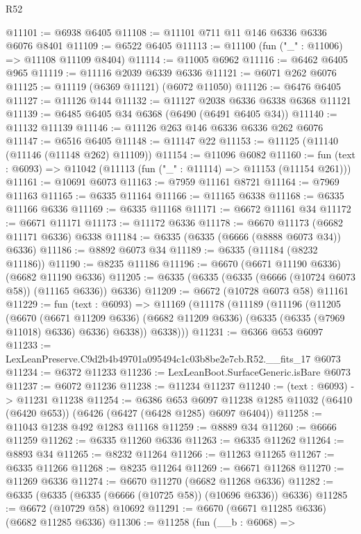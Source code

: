 \begin{lexlean}{R52}
\begin{coremodule}
@11101 := @6938 @6405
@11108 := @11101 @711 @11 @146 @6336 @6336 @6076 @8401
@11109 := @6522 @6405
@11113 := @11100 (fun ("_" : @11006) => @11108 @11109 @8404)
@11114 := @11005 @6962
@11116 := @6462 @6405 @965
@11119 := @11116 @2039 @6339 @6336
@11121 := @6071 @262 @6076
@11125 := @11119 (@6369 @11121) (@6072 @11050)
@11126 := @6476 @6405
@11127 := @11126 @144
@11132 := @11127 @2038 @6336 @6338 @6368 @11121
@11139 := @6485 @6405 @34 @6368 (@6490 (@6491 @6405 @34))
@11140 := @11132 @11139
@11146 := @11126 @263 @146 @6336 @6336 @262 @6076
@11147 := @6516 @6405
@11148 := @11147 @22
@11153 := @11125 (@11140 (@11146 (@11148 @262) @11109))
@11154 := @11096 @6082
@11160 := fun (text : @6093) => @11042 (@11113 (fun ("_" : @11114) => @11153 (@11154 @261)))
@11161 := @10691 @6073
@11163 := @7959 @11161 @8721
@11164 := @7969 @11163
@11165 := @6335 @11164
@11166 := @11165 @6338
@11168 := @6335 @11166 @6336
@11169 := @6335 @11168
@11171 := @6672 @11161 @34
@11172 := @6671 @11171
@11173 := @11172 @6336
@11178 := @6670 @11173 (@6682 @11171 @6336) @6338
@11184 := @6335 (@6335 (@6666 (@8888 @6073 @34)) @6336)
@11186 := @8892 @6073 @34
@11189 := @6335 (@11184 (@8232 @11186))
@11190 := @8235 @11186
@11196 := @6670 (@6671 @11190 @6336) (@6682 @11190 @6336)
@11205 := @6335 (@6335 (@6335 (@6666 (@10724 @6073 @58)) (@11165 @6336)) @6336)
@11209 := @6672 (@10728 @6073 @58) @11161
@11229 := fun (text : @6093) =>
  @11169
    (@11178
      (@11189
        (@11196
          (@11205
            (@6670
              (@6671 @11209 @6336)
              (@6682 @11209 @6336)
              (@6335 (@6335 (@7969 @11018) @6336) @6336)
              @6338))
          @6338)))
@11231 := @6366 @653 @6097
@11233 := LexLeanPreserve.C9d2b4b49701a095494c1c03b8be2e7cb.R52.__fits_17 @6073
@11234 := @6372 @11233
@11236 := LexLeanBoot.SurfaceGeneric.isBare @6073
@11237 := @6072 @11236
@11238 := @11234 @11237
@11240 := (text : @6093) -> @11231 @11238
@11254 := @6386
    @653
    @6097
    @11238
    @1285
    @11032
    (@6410 (@6420 @653))
    (@6426 (@6427 (@6428 @1285) @6097 @6404))
@11258 := @11043 @1238 @492 @1283 @11168
@11259 := @8889 @34
@11260 := @6666 @11259
@11262 := @6335 @11260 @6336
@11263 := @6335 @11262
@11264 := @8893 @34
@11265 := @8232 @11264
@11266 := @11263 @11265
@11267 := @6335 @11266
@11268 := @8235 @11264
@11269 := @6671 @11268
@11270 := @11269 @6336
@11274 := @6670 @11270 (@6682 @11268 @6336)
@11282 := @6335 (@6335 (@6335 (@6666 (@10725 @58)) (@10696 @6336)) @6336)
@11285 := @6672 (@10729 @58) @10692
@11291 := @6670 (@6671 @11285 @6336) (@6682 @11285 @6336)
@11306 := @11258
    (fun (__b : @6068) =>

\end{coremodule}
\end{lexlean}
